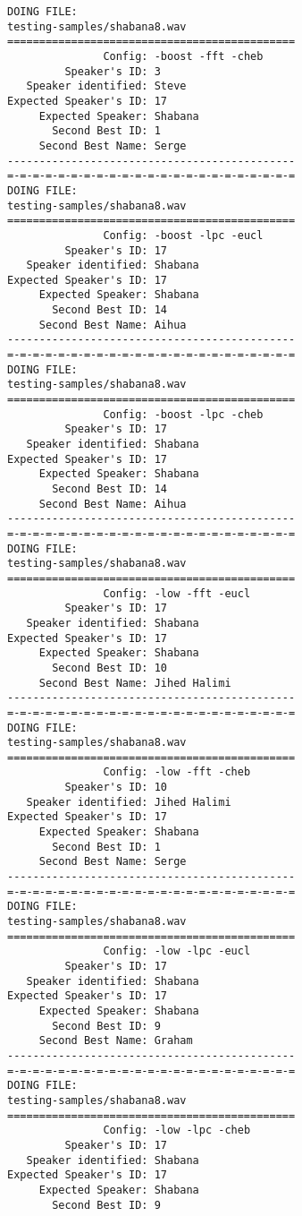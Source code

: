 \begin{verbatim}
DOING FILE:
testing-samples/shabana8.wav
=============================================
               Config: -boost -fft -cheb
         Speaker's ID: 3
   Speaker identified: Steve
Expected Speaker's ID: 17
     Expected Speaker: Shabana
       Second Best ID: 1
     Second Best Name: Serge
---------------------------------------------
=-=-=-=-=-=-=-=-=-=-=-=-=-=-=-=-=-=-=-=-=-=-=
DOING FILE:
testing-samples/shabana8.wav
=============================================
               Config: -boost -lpc -eucl
         Speaker's ID: 17
   Speaker identified: Shabana
Expected Speaker's ID: 17
     Expected Speaker: Shabana
       Second Best ID: 14
     Second Best Name: Aihua
---------------------------------------------
=-=-=-=-=-=-=-=-=-=-=-=-=-=-=-=-=-=-=-=-=-=-=
DOING FILE:
testing-samples/shabana8.wav
=============================================
               Config: -boost -lpc -cheb
         Speaker's ID: 17
   Speaker identified: Shabana
Expected Speaker's ID: 17
     Expected Speaker: Shabana
       Second Best ID: 14
     Second Best Name: Aihua
---------------------------------------------
=-=-=-=-=-=-=-=-=-=-=-=-=-=-=-=-=-=-=-=-=-=-=
DOING FILE:
testing-samples/shabana8.wav
=============================================
               Config: -low -fft -eucl
         Speaker's ID: 17
   Speaker identified: Shabana
Expected Speaker's ID: 17
     Expected Speaker: Shabana
       Second Best ID: 10
     Second Best Name: Jihed Halimi
---------------------------------------------
=-=-=-=-=-=-=-=-=-=-=-=-=-=-=-=-=-=-=-=-=-=-=
DOING FILE:
testing-samples/shabana8.wav
=============================================
               Config: -low -fft -cheb
         Speaker's ID: 10
   Speaker identified: Jihed Halimi
Expected Speaker's ID: 17
     Expected Speaker: Shabana
       Second Best ID: 1
     Second Best Name: Serge
---------------------------------------------
=-=-=-=-=-=-=-=-=-=-=-=-=-=-=-=-=-=-=-=-=-=-=
DOING FILE:
testing-samples/shabana8.wav
=============================================
               Config: -low -lpc -eucl
         Speaker's ID: 17
   Speaker identified: Shabana
Expected Speaker's ID: 17
     Expected Speaker: Shabana
       Second Best ID: 9
     Second Best Name: Graham
---------------------------------------------
=-=-=-=-=-=-=-=-=-=-=-=-=-=-=-=-=-=-=-=-=-=-=
DOING FILE:
testing-samples/shabana8.wav
=============================================
               Config: -low -lpc -cheb
         Speaker's ID: 17
   Speaker identified: Shabana
Expected Speaker's ID: 17
     Expected Speaker: Shabana
       Second Best ID: 9

\end{verbatim}
